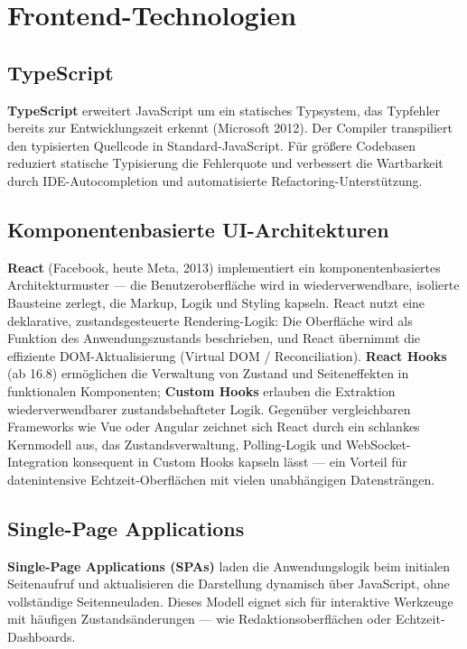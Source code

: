 \section{Frontend-Technologien}\label{frontend-technologien}

\subsection{TypeScript}\label{typescript}

\textbf{TypeScript} erweitert JavaScript um ein statisches Typsystem,
das Typfehler bereits zur Entwicklungszeit erkennt (Microsoft 2012). Der
Compiler transpiliert den typisierten Quellcode in Standard-JavaScript.
Für größere Codebasen reduziert statische Typisierung die Fehlerquote
und verbessert die Wartbarkeit durch IDE-Autocompletion und
automatisierte Refactoring-Unterstützung.

\subsection{Komponentenbasierte
UI-Architekturen}\label{komponentenbasierte-ui-architekturen}

\textbf{React} (Facebook, heute Meta, 2013) implementiert ein
komponentenbasiertes Architekturmuster --- die Benutzeroberfläche wird
in wiederverwendbare, isolierte Bausteine zerlegt, die Markup, Logik und
Styling kapseln. React nutzt eine deklarative, zustandsgesteuerte
Rendering-Logik: Die Oberfläche wird als Funktion des Anwendungszustands
beschrieben, und React übernimmt die effiziente DOM-Aktualisierung
(Virtual DOM / Reconciliation). \textbf{React Hooks} (ab 16.8)
ermöglichen die Verwaltung von Zustand und Seiteneffekten in
funktionalen Komponenten; \textbf{Custom Hooks} erlauben die Extraktion
wiederverwendbarer zustandsbehafteter Logik. Gegenüber vergleichbaren
Frameworks wie Vue oder Angular zeichnet sich React durch ein schlankes
Kernmodell aus, das Zustandsverwaltung, Polling-Logik und
WebSocket-Integration konsequent in Custom Hooks kapseln lässt --- ein
Vorteil für datenintensive Echtzeit-Oberflächen mit vielen unabhängigen
Datensträngen.

\subsection{Single-Page
Applications}\label{single-page-applications}

\textbf{Single-Page Applications (SPAs)} laden die Anwendungslogik beim
initialen Seitenaufruf und aktualisieren die Darstellung dynamisch über
JavaScript, ohne vollständige Seitenneuladen. Dieses Modell eignet sich
für interaktive Werkzeuge mit häufigen Zustandsänderungen --- wie
Redaktionsoberflächen oder Echtzeit-Dashboards.

